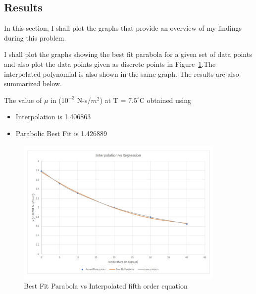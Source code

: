 \documentclass[titlepage, 11pt]{article}
\begin{document}
\subsection{Results}

In this section, I shall plot the graphs that provide an overview of my findings during this problem. 

I shall plot the graphs showing the best fit parabola for a given set of data points and also plot the data points given as discrete points  in Figure~\ref{fig:q13}.The interpolated polynomial is also shown in the same graph. The results are also summarized below. 

The value of $\mu$ in ($10^{-3}$ N-s/$m^2$) at T = $7.5^{\circ}$C obtained using
\begin{itemize}
    \item [1] Interpolation is 1.406863
    \item [2] Parabolic Best Fit is 1.426889
\end{itemize}

\begin{figure}[!tbh]
  	\centering
  	\includegraphics[width=0.9\textwidth]{A5P3Graph.pdf} 
  	\caption{Best Fit Parabola vs Interpolated fifth order equation}
  	\label{fig:q13} 
\end{figure}


\end{document}

